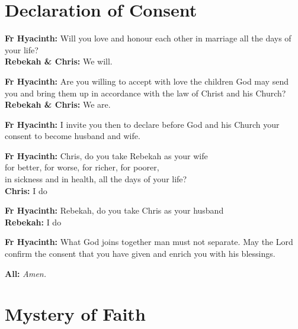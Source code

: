 \documentclass[12pt,landscape]{article}
\begin{document}
\newpage
\begin{multicols}{2}

\section*{Declaration of Consent}

\textbf{Fr Hyacinth:} Will you love and honour each other in marriage all the days of your life?\\
\textbf{Rebekah \& Chris:} We will.

\vspace{0.5em}

\textbf{Fr Hyacinth:} Are you willing to accept with love the children God may send you and bring them up in accordance with the law of Christ and his Church?\\
\textbf{Rebekah \& Chris:} We are.

\vspace{1em}

\textbf{Fr Hyacinth:} I invite you then to declare before God and his Church your consent to become husband and wife.

\vspace{0.5em}

\textbf{Fr Hyacinth:} Chris, do you take Rebekah as your wife\\
for better, for worse, for richer, for poorer,\\
in sickness and in health, all the days of your life?\\
\textbf{Chris:} I do

\vspace{0.5em}

\textbf{Fr Hyacinth:} Rebekah, do you take Chris as your husband\\
\textbf{Rebekah:} I do

\vspace{0.5em}

\textbf{Fr Hyacinth:} What God joins together man must not separate. May the Lord confirm the consent that you have given and enrich you with his blessings.

\textbf{All:} \textit{Amen.}

\columnbreak

\section*{Mystery of Faith}


\end{multicols}
\end{document}

